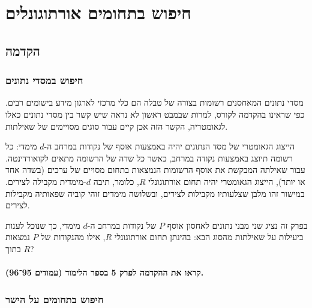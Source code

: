 \documentclass[
]{book}
\begin{document}
\hypertarget{orthogonal-range-seach}{%
\chapter{חיפוש בתחומים אורתוגונלים}\label{orthogonal-range-seach}}

\hypertarget{preface}{%
\section{הקדמה}\label{preface}}

\hypertarget{data-bases}{%
\subsection{חיפוש במסדי נתונים}\label{data-bases}}

מסדי נתונים המאחסנים רשומות בצורה של טבלה הם כלי מרכזי לארגון מידע בישומים רבים. כפי שראינו בהקדמה לקורס, למרות שבמבט ראשון לא נראה שיש קשר בין מסדי נתונים כאלו לגאומטריה, הקשר הזה אכן קיים עבור סוגים מסויימים של שאילתות.

הייצוג הגאומטרי של מסד הנתונים יהיה באמצעות אוסף של נקודות במרחב ה-\(d\) מימדי: כל רשומה תיוצג באמצעות נקודה במרחב, כאשר כל שדה של הרשומה מתאים לקואורדינטה. עבור שאילתה המבקשת את אוסף הרשומות הנמצאות בתחום מסויים של ערכים (בשדה אחד או יותר), הייצוג הגאומטרי יהיה תחום אורתוגונלי \(R\), כלומר, תיבה \(d\)-מימדית מקבילה לצירים. במישור זהו מלבן שצלעותיו מקבילות לצירים, ובשלושה מימדים זוהי קוביה שפאותיה מקבילות לצירים.

בפרק זה נציג שני מבני נתונים לאחסון אוסף \(P\) של נקודות במרחב ה-\(d\) מימדי, כך שנוכל לענות ביעילות על שאילתות מהסוג הבא: בהינתן תחום אורתוגונלי \(R\), אילו מהנקודות של \(P\) נמצאות בתוך \(R\)?

\hypertarget{ux5e7ux5e8ux5d0ux5d5-ux5d0ux5ea-ux5d4ux5d4ux5e7ux5d3ux5deux5d4-ux5dcux5e4ux5e8ux5e7-5-ux5d1ux5e1ux5e4ux5e8-ux5d4ux5dcux5d9ux5deux5d5ux5d3-ux5e2ux5deux5d5ux5d3ux5d9ux5dd-9596.}{%
\subsubsection*{קראו את ההקדמה לפרק 5 בספר הלימוד (עמודים 95־96).}\label{ux5e7ux5e8ux5d0ux5d5-ux5d0ux5ea-ux5d4ux5d4ux5e7ux5d3ux5deux5d4-ux5dcux5e4ux5e8ux5e7-5-ux5d1ux5e1ux5e4ux5e8-ux5d4ux5dcux5d9ux5deux5d5ux5d3-ux5e2ux5deux5d5ux5d3ux5d9ux5dd-9596.}}

\hypertarget{on-the-line}{%
\subsection{חיפוש בתחומים על הישר}\label{on-the-line}}
\end{document}
